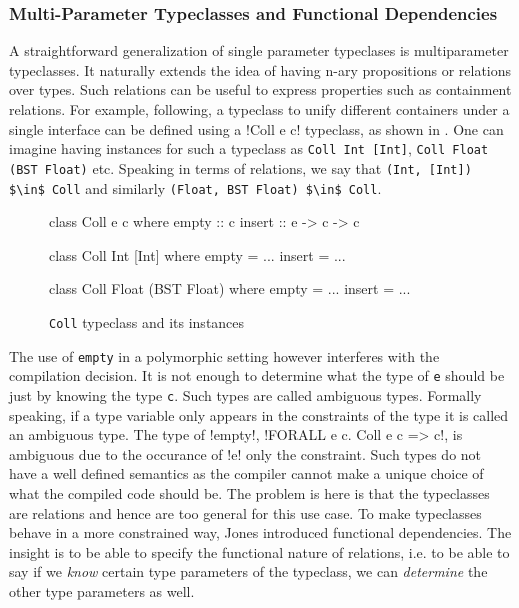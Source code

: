 \documentclass[manuscript,screen,nonacm]{acmart}
\begin{document}
\subsubsection{Multi-Parameter Typeclasses and Functional Dependencies}
A straightforward generalization of single parameter typeclases is multiparameter typeclasses. It naturally extends the idea of having n-ary propositions or relations over types. Such relations can be useful to express properties such as containment relations. For example, following\cite{jones_tcfd_2000}, a typeclass to unify different containers under a single interface can be defined using a !Coll e c! typeclass, as shown in . One can imagine having instances for such a typeclass as \lstinline{Coll Int [Int]}, \lstinline{Coll Float (BST Float)} etc. Speaking in terms of relations, we say that \lstinline{(Int, [Int]) $\in$ Coll} and similarly \lstinline{(Float, BST Float) $\in$ Coll}.

\begin{figure}[ht]
  \centering
  \begin{minipage}[ht]{0.3\linewidth}
    \begin{code}
      class Coll e c
      where
         empty :: c
         insert :: e -> c -> c
    \end{code}
  \end{minipage}%
  \begin{minipage}[ht]{0.3\linewidth}
    \begin{code}
      class Coll Int [Int]
      where
         empty = ...
         insert = ...
    \end{code}
  \end{minipage}%
  \begin{minipage}[ht]{0.3\linewidth}
    \begin{code}
      class Coll Float (BST Float)
      where
         empty = ...
         insert = ...
    \end{code}
  \end{minipage}
  \caption[Coll typeclass]{\lstinline{Coll} typeclass and its instances}
  \label{fig:tc-collection}
\end{figure}

The use of \lstinline{empty} in a polymorphic setting however interferes with the compilation decision. It is not enough to determine what the type of \lstinline{e} should be just by knowing the type \lstinline{c}. Such types are called ambiguous types. Formally speaking, if a type variable only appears in the constraints of the type it is called an ambiguous type. The type of !empty!, !FORALL e c. Coll e c => c!, is ambiguous due to the occurance of !e! only the constraint. Such types do not have a well defined semantics as the compiler cannot make a unique choice of what the compiled code should be. The problem is here is that the typeclasses are relations and hence are too general for this use case. To make typeclasses behave in a more constrained way, Jones introduced functional dependencies\cite{jones_tcfd_2000}. The insight is to be able to specify the functional nature of relations, i.e. to be able to say if we \emph{know} certain type parameters of the typeclass, we can \emph{determine} the other type parameters as well.
\end{document}
